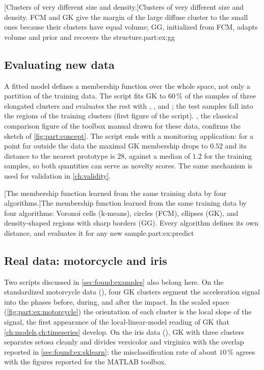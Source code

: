 [Clusters of very different size and density.]{Clusters of very different size and density. FCM and GK give the margin of the large diffuse cluster to the small ones because their clusters have equal volume; GG, initialized from FCM, adapts volume and prior and recovers the structure.}{part:ex:gg}

\subsection{Evaluating new data}\label{sec:part:ex:predict}

A fitted model defines a membership function over the whole space, not only a partition of the training data. The script  fits GK to 60\,\% of the samples of three elongated clusters and evaluates the rest with , , and ; the test samples fall into the regions of the training clusters (first figure of the script). , the classical comparison figure of the toolbox manual drawn for these data, confirms the sketch of \cref{fig:part:concept}. The script ends with a monitoring application: for a point far outside the data the maximal GK membership drops to $0.52$ and its distance to the nearest prototype is $28$, against a median of $1.2$ for the training samples, so both quantities can serve as novelty scores. The same mechanism is used for validation in \cref{ch:validity}.

[The membership function learned from the same training data by four algorithms.]{The membership function learned from the same training data by four algorithms: Voronoi cells (k-means), circles (FCM), ellipses (GK), and density-shaped regions with sharp borders (GG). Every algorithm defines its own distance, and  evaluates it for any new sample.}{part:ex:predict}

\subsection{Real data: motorcycle and iris}\label{sec:part:ex:real}

Two scripts discussed in \cref{sec:found:examples} also belong here. On the standardized motorcycle data (), four GK clusters segment the acceleration signal into the phases before, during, and after the impact. In the scaled space (\cref{fig:part:ex:motorcycle}) the orientation of each cluster is the local slope of the signal, the first appearance of the local-linear-model reading of GK that \cref{ch:models,ch:timeseries} develop. On the iris data (), GK with three clusters separates setosa cleanly and divides versicolor and virginica with the overlap reported in \cref{sec:found:ex:sklearn}; the misclassification rate of about $10\,\%$ agrees with the figures reported for the MATLAB toolbox.


